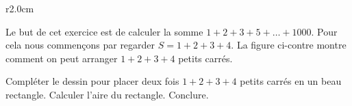 
\begin{exercice}\label{exosmath-0541}


\begin{wrapfigure}{r}{2.0cm}
   \vspace{-0.5cm}        %
   \centering
   
\end{wrapfigure}

    Le but de cet exercice est de calculer la somme \( 1+2+3+5+\ldots+1000\). Pour cela nous commençons par regarder \( S=1+2+3+4\). La figure ci-contre  montre comment on peut arranger \( 1+2+3+4\) petits carrés.

    Compléter le dessin pour placer deux fois \( 1+2+3+4\) petits carrés en un beau rectangle. Calculer l'aire du rectangle. Conclure.

\end{exercice}
